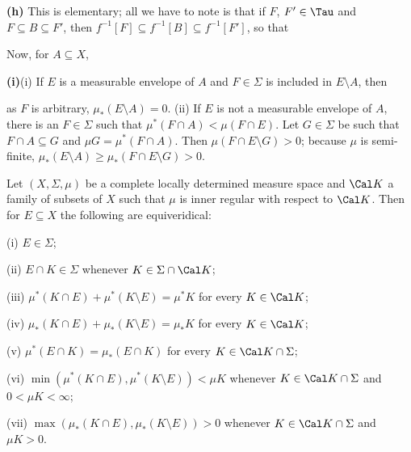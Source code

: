 {\medskip

{\bf (h)} This is elementary;  all we have to note is that if $F$,
$F'\in\Tau$ and $F\subseteq B\subseteq F'$, then
$f^{-1}[F]\subseteq f^{-1}[B]\subseteq f^{-1}[F']$, so that


\noindent Now, for $A\subseteq X$,


\medskip

{\bf (i)}(i) If $E$ is a measurable envelope of $A$ and $F\in\Sigma$ is
included in $E\setminus A$, then


\noindent as $F$ is arbitrary, $\mu_*(E\setminus A)=0$.   (ii) If $E$ is
not a measurable envelope of $A$, there is an $F\in\Sigma$ such that
$\mu^*(F\cap A)<\mu(F\cap E)$.   Let $G\in\Sigma$ be such that
$F\cap A\subseteq G$ and $\mu G=\mu^*(F\cap A)$.   Then
$\mu(F\cap E\setminus G)>0$;  because $\mu$ is semi-finite,
$\mu_*(E\setminus A)\ge\mu_*(F\cap E\setminus G)>0$.
}%

 Let $(X,\Sigma,\mu)$ be a complete locally
determined measure space and $\Cal K$ a family of subsets of $X$ such
that $\mu$ is inner regular with respect to $\Cal K$.
Then for $E\subseteq X$ the following are equiveridical:

\quad(i) $E\in\Sigma$;

\quad(ii) $E\cap K\in\Sigma$ whenever $K\in\Sigma\cap\Cal K$;

\quad(iii) $\mu^*(K\cap E)+\mu^*(K\setminus E)=\mu^*K$ for every
$K\in\Cal K$;

\quad(iv) $\mu_*(K\cap E)+\mu_*(K\setminus E)=\mu_*K$ for every
$K\in\Cal K$;

\quad(v) $\mu^*(E\cap K)=\mu_*(E\cap K)$ for every
$K\in\Cal K\cap\Sigma$;

\quad(vi) $\min(\mu^*(K\cap E),\mu^*(K\setminus E))<\mu K$ whenever
$K\in\Cal K\cap\Sigma$ and $0<\mu K<\infty$;

\quad(vii) $\max(\mu_*(K\cap E),\mu_*(K\setminus E))>0$ whenever
$K\in\Cal K\cap\Sigma$ and $\mu K>0$.

